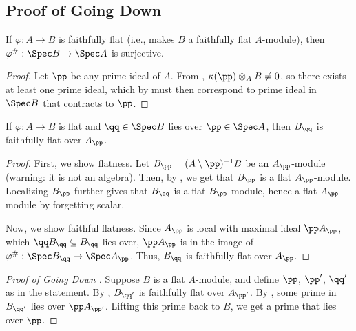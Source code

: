 \subsection{Proof of Going Down}
\begin{corollary}
    \label{cor:faithfully_flat_contraction}
    If $\varphi:A\to B$ is faithfully flat (i.e., makes $B$ a faithfully flat $A$-module), then $\varphi^\#: \Spec B\to \Spec A$ is surjective.
\end{corollary}
\begin{proof}
    Let $\pp$ be any prime ideal of $A$.
    From ,
    $\kappa(\pp) \otimes_A B\neq 0$, so there exists
    at least one prime ideal, which by 
    must then correspond
    to prime ideal in $\Spec B$ that contracts to $\pp$.
\end{proof}
\begin{corollary}
    \label{cor:faithfully_flat_lying}
    If $\varphi:A\to B$ is flat and $\qq\in \Spec B$ lies over $\pp\in \Spec A$, then $B_\qq$ is faithfully flat over $A_\pp$.
\end{corollary}
\begin{proof}
    First, we show flatness. 
    Let $B_\pp = (A\setminus\pp)^{-1} B$ be an $A_\pp$-module
    (warning: it is not an algebra).
    Then, by , we get that
    $B_\pp$ is a flat $A_\pp$-module.
    Localizing $B_\pp$ further gives that $B_\qq$
    is a flat $B_\pp$-module, hence a flat $A_\pp$-module
    by forgetting scalar.

    Now, we show faithful flatness.
    Since $A_\pp$ is local with maximal ideal $\pp A_\pp$, which $\qq B_\qq\subseteq B_\qq$ lies over, $\pp A_\pp$ is in the image of $\varphi^\#: \Spec B_\qq\to\Spec A_\pp$. Thus, $B_\qq$ is faithfully flat over $A_\pp$.
\end{proof}
\begin{proof}[Proof of Going Down ]
    Suppose $B$ is a flat $A$-module, and define $\pp$, $\pp'$, $\qq'$ as in the statement. By , $B_{\qq'}$ is faithfully flat over $A_{\pp'}$. By , some prime in $B_{\qq'}$ lies over $\pp A_{\pp'}$. Lifting this prime back to $B$, we get a prime that lies over $\pp$.
\end{proof}

